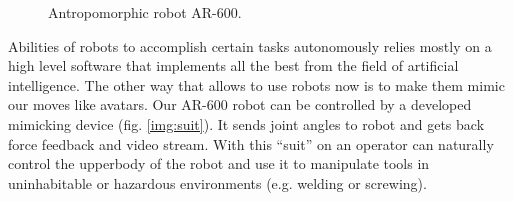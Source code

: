 \documentclass[letterpaper, 10 pt, conference]{ieeeconf}  %
\begin{document}
\begin{figure} [thpb]
      \centering
      \caption{Antropomorphic robot AR-600.}
      \label{img:ar600}
\end{figure}


Abilities of robots to accomplish certain tasks autonomously relies mostly on
a high level software that implements all the best from the field of artificial
intelligence. The other way that allows to use robots now is to make them mimic
our moves like avatars. Our AR-600 robot can be controlled by a developed
mimicking device (fig. \ref{img:suit}). It sends joint angles to robot and
gets back force feedback and video stream. With this ``suit'' on an
operator can naturally control the upperbody of the robot and use it to manipulate tools in uninhabitable or hazardous environments (e.g. welding or screwing).
\end{document}
